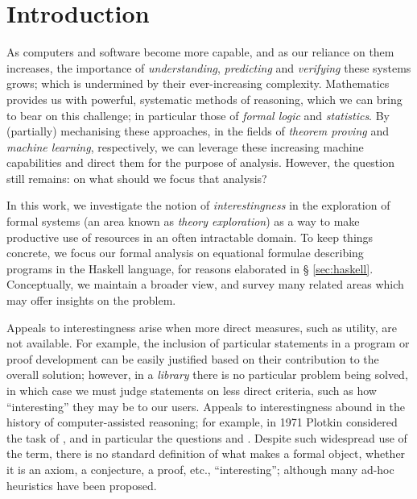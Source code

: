 \chapter{Introduction}

\iffalse TODO: Alison: Each chapter should have a description at the start (see
bucketing ``in this chapter'') \fi

As computers and software become more capable, and as our reliance on them
increases, the importance of \emph{understanding}, \emph{predicting} and
\emph{verifying} these systems grows; which is undermined by their
ever-increasing complexity. Mathematics provides us with powerful, systematic
methods of reasoning, which we can bring to bear on this challenge; in
particular those of \emph{formal logic} and \emph{statistics}. By (partially)
mechanising these approaches, in the fields of \emph{theorem proving} and
\emph{machine learning}, respectively, we can leverage these increasing machine
capabilities and direct them for the purpose of analysis. However, the question
still remains: on what should we focus that analysis?

In this work, we investigate the notion of \emph{interestingness} in the
exploration of formal systems (an area known as \emph{theory exploration}) as a
way to make productive use of resources in an often intractable domain. To keep
things concrete, we focus our formal analysis on equational formulae describing
programs in the Haskell language, for reasons elaborated in \S
\ref{sec:haskell}. Conceptually, we maintain a broader view, and survey many
related areas which may offer insights on the problem.

Appeals to interestingness arise when more direct measures, such as utility, are
not available. For example, the inclusion of particular statements in a program
or proof development can be easily justified based on their contribution to the
overall solution; however, in a \emph{library} there is no particular problem
being solved, in which case we must judge statements on less direct criteria,
such as how ``interesting'' they may be to our users. Appeals to interestingness
abound in the history of computer-assisted reasoning; for example, in 1971
Plotkin \cite{plotkin1971further} considered the task of , and in particular the questions
 and . Despite such widespread use of the term, there is no
standard definition of what makes a formal object, whether it is an axiom, a
conjecture, a proof, etc., ``interesting''; although many ad-hoc heuristics have
been proposed.

